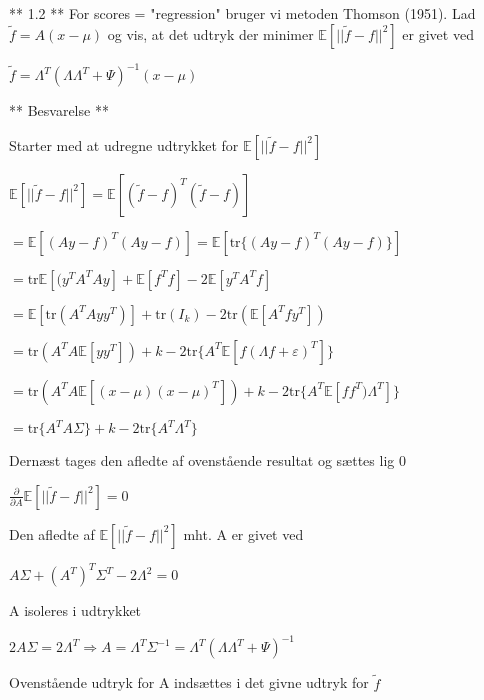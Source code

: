 \documentclass{article}
\begin{document}
	** 1.2 **
	For scores = "regression" bruger vi metoden Thomson (1951). Lad $\tilde{f} = A(x-\mu)$ og vis, at det udtryk der minimer $\mathbb{E}[||\tilde{f}-f||^2]$ er givet ved 
	
	\begin{center}
		$\tilde{f} = \Lambda^T(\Lambda\Lambda^T+\Psi)^{-1}(x-\mu)$
	\end{center}
	
	** Besvarelse **
	
	Starter med at udregne udtrykket for $\mathbb{E}[||\tilde{f}-f||^2]$
	
	\begin{center}
		$\mathbb{E}[||\tilde{f}-f||^2]=\mathbb{E}[(\tilde{f}-f)^T(\tilde{f}-f)]$
		
		$=\mathbb{E}[(Ay-f)^T(Ay-f)]=\mathbb{E}[\text{tr}\lbrace(Ay-f)^T(Ay-f)\rbrace]$
		
		$=\text{tr}\mathbb{E}[(y^TA^TAy]+\mathbb{E}[f^Tf]-2\mathbb{E}[y^TA^Tf]$
		
		$=\mathbb{E}[\text{tr}(A^TAyy^T)]+\text{tr}(I_k)-2\text{tr}(\mathbb{E}[A^Tfy^T])$
		
		$=\text{tr}(A^T A \mathbb{E}[yy^T] ) + k-2\text{tr}\lbrace A^T\mathbb{E}[f(\Lambda f+\varepsilon)^T] \rbrace$
		
		$=\text{tr}(A^T A \mathbb{E}[(x-\mu)(x-\mu)^T] ) + k-2\text{tr}\lbrace A^T\mathbb{E}[ff^T)\Lambda^T] \rbrace$
		
		$=\text{tr}\lbrace A^TA\Sigma\rbrace +k-2\text{tr}\lbrace A^T\Lambda^T\rbrace$
	\end{center}
	
	Dernæst tages den afledte af ovenstående resultat og sættes lig 0
	
	\begin{center}
		$\frac{\partial}{\partial A}\mathbb{E}[||\tilde{f}-f||^2]=0$
	\end{center}
	
	Den afledte af $\mathbb{E}[||\tilde{f}-f||^2]$ mht. A er givet ved
	
	\begin{center}
		$A\Sigma+(A^T)^T\Sigma^T-2\Lambda^2=0$
	\end{center}
	
	A isoleres i udtrykket
	
	\begin{center}
		$2A\Sigma=2\Lambda^T\Rightarrow A=\Lambda^T\Sigma^{-1}=\Lambda^T(\Lambda\Lambda^T+\Psi)^{-1}$
	\end{center}
	
	Ovenstående udtryk for A indsættes i det givne udtryk for $\tilde{f}$
	
\end{document}
